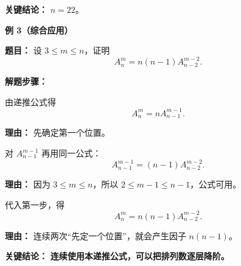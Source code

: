 \begin{examplebox}
\textbf{\textcolor{CExample}{关键结论：}} \textbf{$n=22$}。

\medskip
\textbf{\textcolor{CExample}{例 3（综合应用）}}

\textbf{\textcolor{CExample}{题目：}} 设 $3\leq m\leq n$，证明
\[
A_n^m=n(n-1)A_{n-2}^{m-2}.
\]

\textbf{\textcolor{CExample}{解题步骤：}}
\begin{description}[style=nextline, leftmargin=2.8em, labelsep=0.5em, itemsep=0.45em]
    \item[\textbf{第一步（第一次降阶）：}] 由递推公式得
    \[
    A_n^m=nA_{n-1}^{m-1}.
    \]
    \par\textbf{理由：} 先确定第一个位置。

    \item[\textbf{第二步（第二次降阶）：}] 对 $A_{n-1}^{m-1}$ 再用同一公式：
    \[
    A_{n-1}^{m-1}=(n-1)A_{n-2}^{m-2}.
    \]
    \par\textbf{理由：} 因为 $3\leq m\leq n$，所以 $2\leq m-1\leq n-1$，公式可用。

    \item[\textbf{第三步（合并）：}] 代入第一步，得
    \[
    A_n^m=n(n-1)A_{n-2}^{m-2}.
    \]
    \par\textbf{理由：} 连续两次“先定一个位置”，就会产生因子 $n(n-1)$。
\end{description}

\textbf{\textcolor{CExample}{关键结论：}} \textbf{连续使用本递推公式，可以把排列数逐层降阶。}
\end{examplebox}
